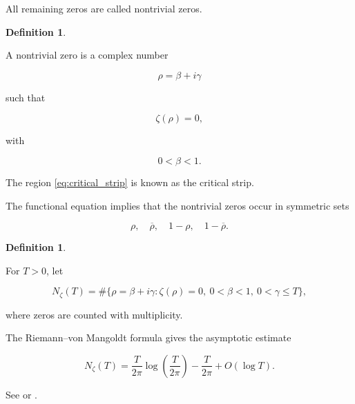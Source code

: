 \documentclass[11pt]{amsart}
\numberwithin{equation}{section}
\theoremstyle{plain}
\theoremstyle{definition}
\newtheorem{definition}[theorem]{Definition}
\theoremstyle{remark}
\begin{document}
All remaining zeros are called nontrivial zeros.

\begin{definition}
\label{def:nontrivial_zero}

A nontrivial zero is a complex number

\begin{equation}
\rho
=
\beta+i\gamma
\label{eq:rho_definition}
\end{equation}

such that

\begin{equation}
\zeta(\rho)=0,
\label{eq:rho_zero_condition}
\end{equation}

with

\begin{equation}
0<\beta<1.
\label{eq:critical_strip}
\end{equation}

\end{definition}

The region
\eqref{eq:critical_strip}
is known as the critical strip.

The functional equation implies that the nontrivial zeros occur in
symmetric sets

\begin{equation}
\rho,
\quad
\overline{\rho},
\quad
1-\rho,
\quad
1-\overline{\rho}.
\label{eq:zero_symmetry}
\end{equation}

\begin{definition}
\label{def:zeta_zero_counting_function}

For \(T>0\), let

\begin{equation}
N_\zeta(T)
=
\#\{\rho=\beta+i\gamma:\zeta(\rho)=0,\ 0<\beta<1,\ 0<\gamma\leq T\},
\label{eq:zeta_zero_counting_function}
\end{equation}

where zeros are counted with multiplicity.

\end{definition}

The Riemann--von Mangoldt formula gives the asymptotic estimate

\begin{equation}
N_\zeta(T)
=
\frac{T}{2\pi}
\log\!\left(
\frac{T}{2\pi}
\right)
-
\frac{T}{2\pi}
+
O(\log T).
\label{eq:riemann_von_mangoldt}
\end{equation}

See
\cite{Titchmarsh1986}
or
\cite{Edwards2001}.
\end{document}
